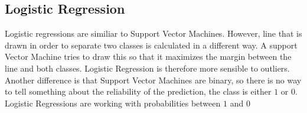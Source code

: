 \subsection{Logistic Regression}
Logistic regressions are similiar to Support Vector Machines. However, line that is drawn in order to separate two classes is calculated in a different way. A support Vector Machine tries to draw this so that it maximizes the margin between the line and both classes. Logistic Regression is therefore more sensible to outliers. Another difference is that Support Vector Machines are binary, so there is no way to tell something about the reliability of the prediction, the class is either $1$ or $0$. Logistic Regressions are working with probabilities between $1$ and $0$


